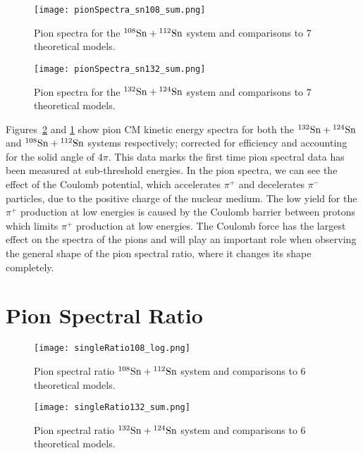 \begin{figure}[!htb]
\centering
\texttt{[image: pionSpectra\_sn108\_sum.png]}
\caption{Pion spectra for the ${}^{108}\mathrm{Sn} + {}^{112}\mathrm{Sn}$ system and comparisons to 7 theoretical models. }
\label{fig:pionspectraSn108}
\end{figure}


\begin{figure}[!htb]
\centering
\texttt{[image: pionSpectra\_sn132\_sum.png]}
\caption{Pion spectra for the ${}^{132}\mathrm{Sn} + {}^{124}\mathrm{Sn}$ system and comparisons to 7 theoretical models. }
\label{fig:pionspectraSn132}
\end{figure}


Figures~\ref{fig:pionspectraSn132} and \ref{fig:pionspectraSn108} show pion CM kinetic energy spectra for both the ${}^{132}\mathrm{Sn} + {}^{124}\mathrm{Sn}$ and ${}^{108}\mathrm{Sn} + {}^{112}\mathrm{Sn}$ systems respectively; corrected for efficiency and accounting for the solid angle of 4$\pi$. This data marks the first time pion spectral data has been measured at sub-threshold energies. In the pion spectra, we can see the effect of the Coulomb potential, which accelerates $\pi^+$ and decelerates $\pi^-$ particles, due to the positive charge of the nuclear medium. The low yield for the $\pi^+$ production at low energies is caused by the Coulomb barrier between protons which limits $\pi^+$ production at low energies. The Coulomb force has the largest effect on the spectra of the pions and will play an important role when observing the general shape of the pion spectral ratio, where it changes its shape completely. 



\section{Pion Spectral Ratio}

\begin{figure}[!htb]
\centering
\texttt{[image: singleRatio108\_log.png]}
\caption{Pion spectral ratio ${}^{108}\mathrm{Sn} + {}^{112}\mathrm{Sn}$ system and comparisons to 6 theoretical models.}
\label{fig:SRsn108}
\end{figure}

\begin{figure}[!htb]
\centering
\texttt{[image: singleRatio132\_sum.png]}
\caption{Pion spectral ratio ${}^{132}\mathrm{Sn} + {}^{124}\mathrm{Sn}$ system and comparisons to 6 theoretical models.}
\label{fig:SRsn132}
\end{figure}

